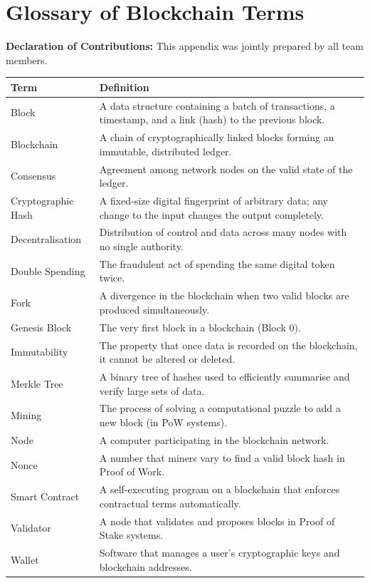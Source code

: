 \chapter{Glossary of Blockchain Terms}
\label{app:glossary}

\noindent\textbf{Declaration of Contributions:} This appendix was jointly prepared by all team members.

\bigskip

\begin{longtable}{l p{10cm}}
\toprule
\textbf{Term} & \textbf{Definition} \\
\midrule
\endhead
Block & A data structure containing a batch of transactions, a timestamp, and a link (hash) to the previous block. \\
Blockchain & A chain of cryptographically linked blocks forming an immutable, distributed ledger. \\
Consensus & Agreement among network nodes on the valid state of the ledger. \\
Cryptographic Hash & A fixed-size digital fingerprint of arbitrary data; any change to the input changes the output completely. \\
Decentralisation & Distribution of control and data across many nodes with no single authority. \\
Double Spending & The fraudulent act of spending the same digital token twice. \\
Fork & A divergence in the blockchain when two valid blocks are produced simultaneously. \\
Genesis Block & The very first block in a blockchain (Block 0). \\
Immutability & The property that once data is recorded on the blockchain, it cannot be altered or deleted. \\
Merkle Tree & A binary tree of hashes used to efficiently summarise and verify large sets of data. \\
Mining & The process of solving a computational puzzle to add a new block (in PoW systems). \\
Node & A computer participating in the blockchain network. \\
Nonce & A number that miners vary to find a valid block hash in Proof of Work. \\
Smart Contract & A self-executing program on a blockchain that enforces contractual terms automatically. \\
Validator & A node that validates and proposes blocks in Proof of Stake systems. \\
Wallet & Software that manages a user's cryptographic keys and blockchain addresses. \\
\bottomrule
\end{longtable}
